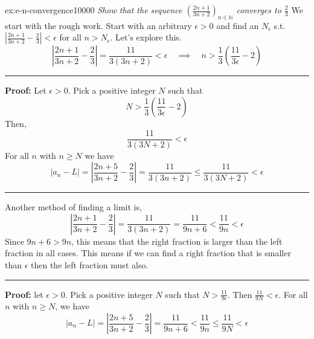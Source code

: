 \documentclass[landscape, 8pt]{extarticle}
\begin{document}
\begin{multicols}{3}
\begin{xmp}{ex:e-n-convergence}{10000}
    \textit{Show that the sequence $\left( \frac{2n+1}{3n+2} \right)_{n\in\mathbb{N}}$ converges to $\frac{2}{3}$}
    \vspace{0pt}\newline
    We start with the rough work. Start with an arbitrary $\epsilon>0$ and find an $N_{\epsilon}$ s.t. $\left\lvert  \frac{2n+1}{3n+2} -\frac{2}{3}  \right\rvert < \epsilon$ for all $n>N_{\epsilon}$. Let's explore this.
    \[\left\lvert  \frac{2n+1}{3n+2}-\frac{2}{3}  \right\rvert =\frac{11}{3(3n+2)} < \epsilon\quad\implies \quad n> \frac{1}{3}\left( \frac{11}{3\epsilon} -2\right)\]
    \vspace{3pt}
    \hrule
    \vspace{3pt}
    \noindent\textbf{Proof:} Let $\epsilon>0$. Pick a positive integer $N$ such that
    \[N>\frac{1}{3}\left( \frac{11}{3\epsilon}-2 \right)\]
    Then,
    \[\frac{11}{3(3N+2)} < \epsilon\]
    For all $n$ with $n\ge N$ we have 
    \[\lvert a_{n}-L \rvert = \left\lvert  \frac{2n+5}{3n+2} - \frac{2}{3}  \right\rvert =\frac{11}{3(3n+2)} \le \frac{11}{3(3N+2)}<\epsilon\]
    \vspace{3pt}
    \hrule
    \vspace{3pt}
    \noindent Another method of finding a limit is,
    $$\left\lvert  \frac{2n+1}{3n+2}-\frac{2}{3}  \right\rvert =\frac{11}{3(3n+2)} = \frac{11}{9n+6} < \frac{11}{9n}< \epsilon$$
    Since $9n+6>9n$, this means that the right fraction is larger than the left fraction in all cases. This means if we can find a right fraction that is smaller than $\epsilon$ then the left fraction must also.
    \vspace{3pt}
    \hrule
    \vspace{3pt}
    \noindent\textbf{Proof:} let $\epsilon>0$. Pick a positive integer $N$ such that $N>\frac{11}{9\epsilon}$. Then $\frac{11}{9N} < \epsilon$. For all $n$ with $n\ge N$, we have
    $$\lvert a_{n}-L \rvert = \left\lvert  \frac{2n+5}{3n+2} - \frac{2}{3}  \right\rvert =\frac{11}{9n+6} < \frac{11}{9n} \le \frac{11}{9N}<\epsilon$$
\end{xmp}
\vspace{-5pt}

\newpage


\end{multicols}
\end{document}
